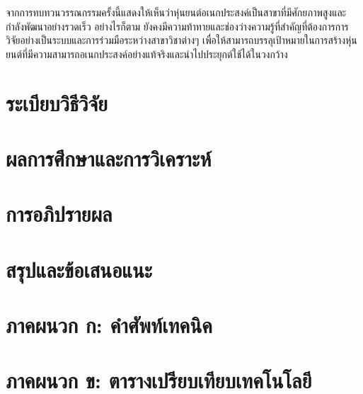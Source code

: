 \documentclass[a4paper]{article}
\begin{document}
จากการทบทวนวรรณกรรมครั้งนี้แสดงให้เห็นว่าหุ่นยนต์อเนกประสงค์เป็นสาขาที่มีศักยภาพสูงและกำลังพัฒนาอย่างรวดเร็ว อย่างไรก็ตาม ยังคงมีความท้าทายและช่องว่างความรู้ที่สำคัญที่ต้องการการวิจัยอย่างเป็นระบบและการร่วมมือระหว่างสาขาวิชาต่างๆ เพื่อให้สามารถบรรลุเป้าหมายในการสร้างหุ่นยนต์ที่มีความสามารถอเนกประสงค์อย่างแท้จริงและนำไปประยุกต์ใช้ได้ในวงกว้าง

\section{ระเบียบวิธีวิจัย}

\section{ผลการศึกษาและการวิเคราะห์}

\section{การอภิปรายผล}

\section{สรุปและข้อเสนอแนะ}

\printbibliography[title=เอกสารอ้างอิง]

\appendix

\section{ภาคผนวก ก: คำศัพท์เทคนิค}

\section{ภาคผนวก ข: ตารางเปรียบเทียบเทคโนโลยี}
\end{document}

